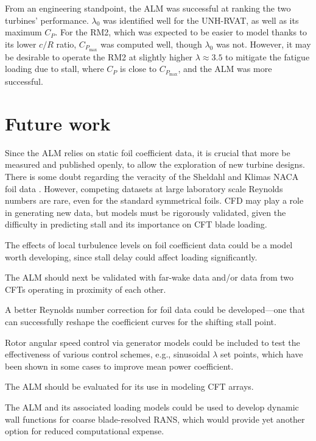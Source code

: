 From an engineering standpoint, the ALM was successful at ranking the two
turbines' performance. $\lambda_0$ was identified well for the UNH-RVAT, as well
as its maximum $C_P$. For the RM2, which was expected to be easier to model
thanks to its lower $c/R$ ratio, $C_{P_{\max}}$ was computed well, though
$\lambda_0$ was not. However, it may be desirable to operate the RM2 at slightly
higher $\lambda \approx 3.5$ to mitigate the fatigue loading due to stall, where
$C_P$ is close to $C_{P_{\max}}$, and the ALM was more successful.


\section{Future work}

Since the ALM relies on static foil coefficient data, it is crucial that more be
measured and published openly, to allow the exploration of new turbine designs.
There is some doubt regarding the veracity of the Sheldahl and Klimas NACA foil
data \cite{Bedon2014}. However, competing datasets at large laboratory scale
Reynolds numbers are rare, even for the standard symmetrical foils. CFD may play
a role in generating new data, but models must be rigorously validated, given
the difficulty in predicting stall and its importance on CFT blade loading.

The effects of local turbulence levels on foil coefficient data could be a model
worth developing, since stall delay could affect loading significantly.

The ALM should next be validated with far-wake data and/or data from two CFTs
operating in proximity of each other.

A better Reynolds number correction for foil data could be developed---one that
can successfully reshape the coefficient curves for the shifting stall point.

Rotor angular speed control via generator models could be included to test the
effectiveness of various control schemes, e.g., sinusoidal $\lambda$ set points,
which have been shown in some cases to improve mean power coefficient.

The ALM should be evaluated for its use in modeling CFT arrays.

The ALM and its associated loading models could be used to develop dynamic wall
functions for coarse blade-resolved RANS, which would provide yet another option
for reduced computational expense.

